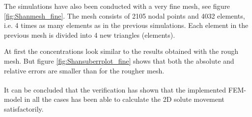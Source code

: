 The simulations have also been conducted with a very fine mesh, see
figure \ref{fig:Shanmesh_fine}. The mesh consists of 2105 nodal points
and 4032 elements, i.e. 4 times as many elements as in the previous
simulations. Each element in the previous mesh is divided
into 4 new triangles (elements).




At first the concentrations look similar to the results obtained with
the rough mesh. But figure \ref{fig:Shansuberrplot_fine} shows that
both the absolute and relative errors are smaller than for the rougher
mesh. \\
\\
It can be concluded that the verification has shown that the
implemented FEM-model in all the cases has been able to calculate the
2D solute movement satisfactorily.


